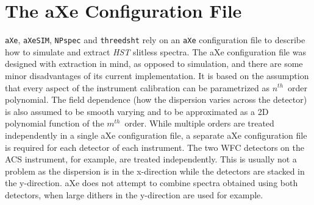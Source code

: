 \documentclass[preprint]{aastex}
\begin{document}
%
%




\newpage

\appendix

\section{The aXe Configuration File}\label{sec:axeconf}
\texttt{aXe}, \texttt{aXeSIM}, \texttt{NPspec} and \texttt{threedsht} rely on an \texttt{aXe} configuration file to describe how to simulate and extract \textit{HST} slitless spectra. The aXe configuration file was designed with extraction in mind, as opposed to simulation, and there are some minor disadvantages of its current implementation. It is based on the assumption that every aspect of the instrument calibration can be parametrized as $n^{th}$\ order polynomial. The field dependence (how the dispersion varies across the detector) is also assumed to be smooth varying and to be approximated as a 2D polynomial function of the $m^{th}$\ order. While multiple orders are treated independently in a single aXe configuration file, a separate aXe configuration file is required for each detector of each instrument. The two WFC detectors on the ACS instrument, for example, are treated independently. This is usually not a problem as the dispersion is in the x-direction while the detectors are stacked in the y-direction. aXe does not attempt to combine spectra obtained using both detectors, when large dithers in the y-direction are used for example.
\end{document}
